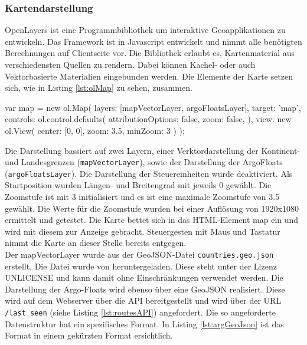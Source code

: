 \subsubsection{Kartendarstellung}

 OpenLayers ist eine Programmbibliothek um interaktive Geoapplikationen zu entwickeln. Das \gls{Framework} ist in Javascript entwickelt und nimmt alle benötigten Berechnungen auf Clientseite vor. Die Bibliothek erlaubt es, Kartenmaterial aus verschiedensten Quellen zu rendern. Dabei können Kachel- oder auch Vektorbasierte Materialien eingebunden werden.
Die Elemente der Karte setzen sich, wie in Listing \ref{lst:olMap} zu sehen, zusammen.

\begin{javascript}[label={lst:olMap}, caption={Das ol.Map Element aus der Kartendarstellung}]
 var map = new ol.Map({
    layers: [mapVectorLayer, argoFloatsLayer],
    target: 'map',
    controls: ol.control.defaults({
        attributionOptions: false,
        zoom: false,
    }),
    view: new ol.View({
        center: [0, 0],
        zoom: 3.5,
        minZoom: 3
    })
});
\end{javascript}

Die Darstellung bassiert auf zwei Layern, einer Verktordarstellung der Kontinent- und Landesgrenzen (\texttt{mapVectorLayer}), sowie der Darstellung der ArgoFloats (\texttt{argoFloatsLayer}). Die Darstellung der Steuereinheiten wurde deaktiviert. Als Startposition wurden Längen- und Breitengrad mit jeweils 0 gewählt. Die Zoomstufe ist mit 3 initialisiert und es ist eine maximale Zoomstufe von 3.5 gewählt. Die Werte für die Zoomstufe wurden bei einer Auflösung von 1920x1080 ermittelt und getestet.
Die Karte bettet sich in das HTML-Element map ein und wird mit diesem zur Anzeige gebracht. Steuergesten mit Maus und Tastatur nimmt die Karte an dieser Stelle bereits entgegen.
\\
Der mapVectorLayer wurde aus der GeoJSON-Datei \texttt{countries.geo.json}  erstellt. Die Datei wurde von \cite{sundstrm16} heruntergeladen. Diese steht unter der Lizenz UNLICENSE und kann damit ohne Einschränkungen verwendet werden. Die Darstellung der Argo-Floats wird ebenso über eine GeoJSON realisiert. Diese wird auf dem Webserver über die \gls{API} bereitgestellt und wird über der URL \texttt{/last\_seen}  (siehe Listing \ref{lst:routesAPI}) angefordert. Die so angeforderte Datenstruktur hat ein spezifisches Format. In Listing \ref{lst:argGeoJson} ist das Format in einem gekürzten Format ersichtlich.

